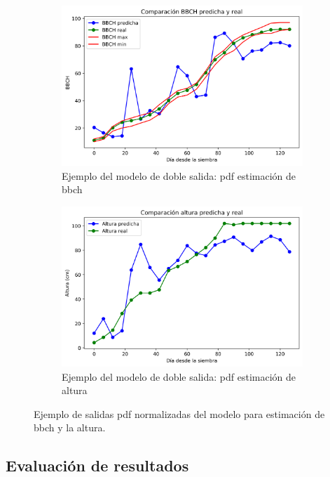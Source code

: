 \begin{figure}[H]
\centering
\begin{subfigure}{\textwidth}
  \centering
  \includegraphics[width=0.95\linewidth]{archivos/tfg/Mean/TEST_PARC_FINAL_BH}
  \caption{Ejemplo del modelo de doble salida: \gls{pdf} estimación de \gls{bbch}\label{fig:sub_c1}}
\end{subfigure}
\begin{subfigure}{\textwidth}
  \centering
  \includegraphics[width=0.95\linewidth]{archivos/tfg/Mean/TEST_PARC_FINAL_BH_H}
  \caption{Ejemplo del modelo de doble salida: \gls{pdf} estimación de altura\label{fig:sub_c2}}
\end{subfigure}
\caption{Ejemplo de salidas \gls{pdf} normalizadas del modelo para estimación de \gls{bbch} y la altura. \label{fig:comp_bh}}
\end{figure}
\subsection{Evaluación de resultados}


